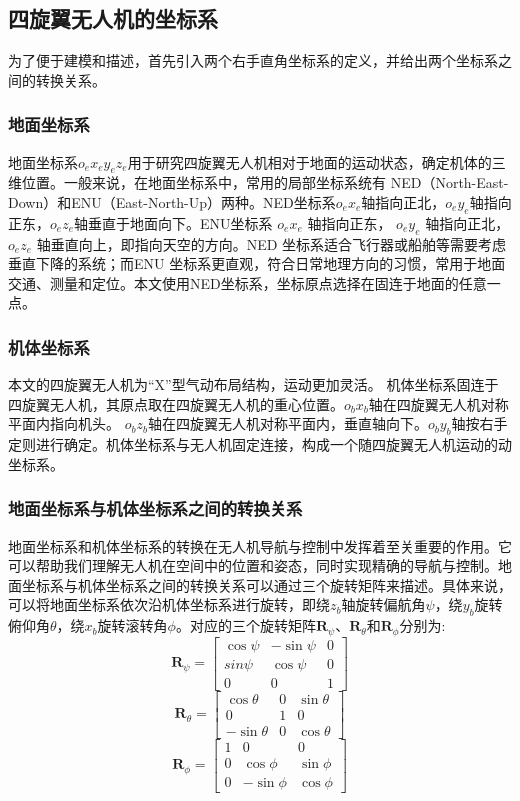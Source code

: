 \documentclass[lang=chs, degree=master, blindreview=false, winfonts=true]{yanputhesis}
\begin{document}
\subsection{四旋翼无人机的坐标系}
为了便于建模和描述，首先引入两个右手直角坐标系的定义，并给出两个坐标系之间的转换关系。
\subsubsection{地面坐标系}
地面坐标系$o_ex_ey_ez_e$用于研究四旋翼无人机相对于地面的运动状态，确定机体的三维位置。一般来说，在地面坐标系中，常用的局部坐标系统有 NED（North-East-Down）和ENU（East-North-Up）两种。NED坐标系$o_ex_e$轴指向正北，$o_ey_e$轴指向正东，$o_ez_e$轴垂直于地面向下。ENU坐标系 $o_ex_e$ 轴指向正东，
$o_ey_e$ 轴指向正北，$o_ez_e$ 轴垂直向上，即指向天空的方向。NED 坐标系适合飞行器或船舶等需要考虑垂直下降的系统；而ENU 坐标系更直观，符合日常地理方向的习惯，常用于地面交通、测量和定位。本文使用NED坐标系，坐标原点选择在固连于地面的任意一点。

\subsubsection{机体坐标系}
本文的四旋翼无人机为“X”型气动布局结构，运动更加灵活。
机体坐标系固连于四旋翼无人机，其原点取在四旋翼无人机的重心位置。$o_bx_b$轴在四旋翼无人机对称平面内指向机头。 $o_bz_b$轴在四旋翼无人机对称平面内，垂直轴向下。$o_by_b$轴按右手定则进行确定。机体坐标系与无人机固定连接，构成一个随四旋翼无人机运动的动坐标系。
\subsubsection{地面坐标系与机体坐标系之间的转换关系}
地面坐标系和机体坐标系的转换在无人机导航与控制中发挥着至关重要的作用。它可以帮助我们理解无人机在空间中的位置和姿态，同时实现精确的导航与控制。地面坐标系与机体坐标系之间的转换关系可以通过三个旋转矩阵来描述。具体来说，可以将地面坐标系依次沿机体坐标系进行旋转，即绕$z_b$轴旋转偏航角$\psi$，绕$y_b$旋转俯仰角$\theta$，绕$x_b$旋转滚转角$\phi$。对应的三个旋转矩阵$\boldsymbol{R}_\psi$、$\boldsymbol{R}_\theta$和$\boldsymbol{R}_\phi$分别为:
$$
\boldsymbol{R}_\psi=\begin{bmatrix}\cos\psi&-\sin\psi&0\\sin\psi&\cos\psi&0\\0&0&1\end{bmatrix} $$
$$	\boldsymbol{R}_\theta=\begin{bmatrix}\cos\theta&0&\sin\theta\\0&1&0\\-\sin\theta&0&\cos\theta\end{bmatrix} $$
$$\boldsymbol{R}_\phi=\begin{bmatrix}1&0&0\\0&\cos\phi&\sin\phi\\0&-\sin\phi&\cos\phi\end{bmatrix}
$$
\end{document}
